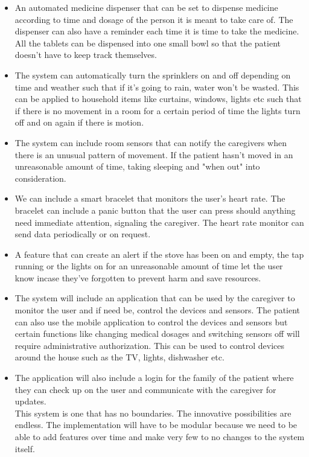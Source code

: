 \documentclass[12pt]{article}
\begin{document}
	\begin{itemize}
		
		\item An automated medicine dispenser that can be set to dispense medicine according to time and dosage of the person it is meant to take care of. The dispenser can also have a reminder each time it is time to take the medicine. All the tablets can be dispensed into one small bowl so that the patient doesn't have to keep track themselves.	
		\item The system can automatically turn the sprinklers on and off depending on time and weather such that if it's going to rain, water won't be wasted. This can be applied to household items like curtains, windows, lights etc such that if there is no movement in a room for a certain period of time the lights turn off and on again if there is motion. 	
		\item The system can include room sensors that can notify the caregivers when there is an unusual pattern of movement. If the patient hasn't moved in an unreasonable amount of time, taking sleeping and "when out" into consideration.	
		\item We can include a smart bracelet that monitors the user's heart rate. The bracelet can include a panic button that the user can press should anything need immediate attention, signaling the caregiver. The heart rate monitor can send data periodically or on request.	
		\item A feature that can create an alert if the stove has been on and empty, the tap running or the lights on for an unreasonable amount of time let the user know incase they've forgotten to prevent harm and save resources.	
		\item The system will include an application that can be used by the caregiver to monitor the user and if need be, control the devices and sensors. The patient can also use the mobile application to control the devices and sensors but certain functions like changing medical dosages and switching sensors off will require administrative authorization. This can be used to control devices around the house such as the TV, lights, dishwasher etc.	
		\item The application will also include a login for the family of the patient where they can check up on the user and communicate with the caregiver for updates.  \\		
		This system is one that has no boundaries. The innovative possibilities are endless. The implementation will have to be modular because we need to be able to add features over time and make very few to no changes to the system itself.\\		
	\end{itemize}
\end{document}
